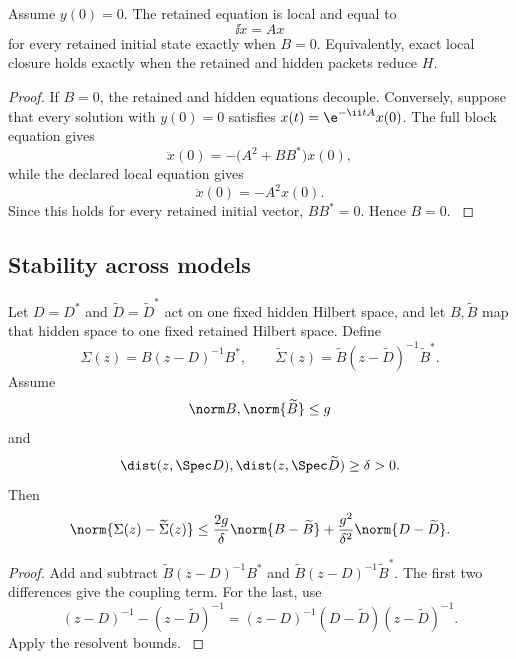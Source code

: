 \begin{theorem}\label{strong:theorem:034}\label{strong:thm:local_closure}
Assume \(y(0)=0\). The retained equation is local and equal to
\[
\ii\dot x=Ax
\]
for every retained initial state exactly when \(B=0\). Equivalently, exact local closure holds exactly when the retained and hidden packets reduce \(H\).
\end{theorem}

\begin{proof}\label{strong:proof:053}
If \(B=0\), the retained and hidden equations decouple. Conversely, suppose that every solution with \(y(0)=0\) satisfies \(x(t)=\e^{-\ii tA}x(0)\). The full block equation gives
\[
\ddot x(0)
=
-\bigl(A^2+BB^*\bigr)x(0),
\]
while the declared local equation gives
\[
\ddot x(0)=-A^2x(0).
\]
Since this holds for every retained initial vector, \(BB^*=0\). Hence \(B=0\).
\label{strong:proof:053:end}\end{proof}

\subsection{Stability across models}\label{strong:subsec:feshbach_stability}

\begin{theorem}\label{strong:theorem:035}\label{strong:thm:self_energy_stability}
Let \(D=D^*\) and \(\widetilde D=\widetilde D^*\) act on one fixed hidden Hilbert space, and let \(B,\widetilde B\) map that hidden space to one fixed retained Hilbert space. Define
\[
\Sigma(z)=B(z-D)^{-1}B^*,
\qquad
\widetilde\Sigma(z)=\widetilde B(z-\widetilde D)^{-1}\widetilde B^*.
\]
Assume
\[
\norm B,\norm{\widetilde B}\leq g
\]
and
\[
\dist(z,\Spec D),
\dist(z,\Spec\widetilde D)
\geq\delta>0.
\]
Then
\[
\norm{\Sigma(z)-\widetilde\Sigma(z)}
\leq
\frac{2g}{\delta}\norm{B-\widetilde B}
+
\frac{g^2}{\delta^2}\norm{D-\widetilde D}.
\]
\end{theorem}

\begin{proof}\label{strong:proof:054}
Add and subtract \(\widetilde B(z-D)^{-1}B^*\) and \(\widetilde B(z-D)^{-1}\widetilde B^*\). The first two differences give the coupling term. For the last, use
\[
(z-D)^{-1}-(z-\widetilde D)^{-1}
=(z-D)^{-1}(D-\widetilde D)(z-\widetilde D)^{-1}.
\]
Apply the resolvent bounds.
\label{strong:proof:054:end}\end{proof}

